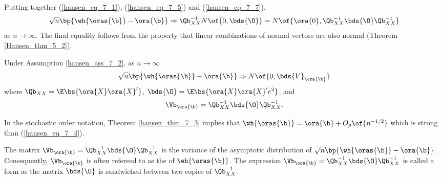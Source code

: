 Putting together (\ref{hansen_eq_7_1}), (\ref{hansen_eq_7_5}) and (\ref{hansen_eq_7_7}),
\begin{equation}
    \notag
    \sqrt{n} \bp{\wh{\oras{\b}} - \ora{\b}} \Rightarrow \Qb_{XX}^{-1} N\of{0, \bds{\O}} = N\of{\ora{0}, \Qb_{XX}^{-1}\bds{\O}\Qb_{XX}^{-1}}
\end{equation}
as $n \rightarrow \infty$. The final equality follows from the property that linear combinations of normal vectors are also normal (Theorem \ref{Hansen_thm_5_2}).

\begin{theorem}
    \label{hansen_thm_7_3}

    Under Assumption \ref{hansen_ass_7_2}, as $n \rightarrow \infty$
    \begin{equation}
        \notag
        \sqrt{n} \bp{\wh{\oras{\b}} - \ora{\b}} \Rightarrow N\of{0, \bds{V}_{\ora{\b}}}
    \end{equation}
    where $\Qb_{XX} = \E\bs{\ora{X}\ora{X}^\prime}$, $\bds{\O} = \E\bs{\ora{X}\ora{X}^\prime e^2}$, and 
    \begin{equation}
        \label{hansen_eq_7_8}
        \Vb_{\ora{\b}} = \Qb_{XX}^{-1} \bds{\O} \Qb_{XX}^{-1}.
    \end{equation}
\end{theorem}

In the stochastic order notation, Theorem \ref{hansen_thm_7_3} implies that $\wh{\oras{\b}} = \ora{\b} + O_p\of{n^{-1/2}}$ which is strong than (\ref{hansen_eq_7_4}).

The matrix $\Vb_{\ora{\b}} = \Qb_{XX}^{-1} \bds{\O} \Qb_{XX}^{-1}$ is the variance of the asymptotic distribution of $\sqrt{n} \bp{\wh{\oras{\b}} - \ora{\b}}$. Consequently, $\Vb_{\ora{\b}}$ is often refereed to as the  of $\wh{\oras{\b}}$. The expression $\Vb_{\ora{\b}} = \Qb_{XX}^{-1} \bds{\O} \Qb_{XX}^{-1}$ is called a  form as the matrix $\bds{\O}$ is sandwiched between two copies of $\Qb_{XX}^{-1}$.

